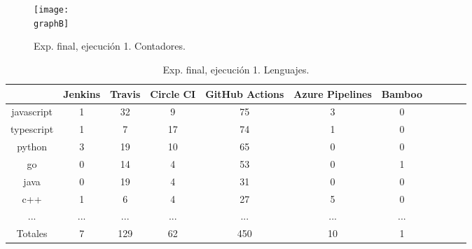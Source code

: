 \begin{figure}
  \centering
  \texttt{[image: \\graphB]}
  \caption{Exp. final, ejecución 1. Contadores.}
\end{figure}

\begin{table}
  \centering
  \caption{Exp. final, ejecución 1. Lenguajes.}
  \label{tab:tabla_f1_2a}

\begin{footnotesize}
\renewcommand{\arraystretch}{1.5} %
\begin{tabular}{ccccccccccc}
  \hline
  {} &  Jenkins &  Travis &  Circle CI &  GitHub Actions &  Azure Pipelines &  Bamboo \\
  \hline
  javascript       &        1 &      32 &          9 &              75 &                3 &       0 \\
  typescript       &        1 &       7 &         17 &              74 &                1 &       0 \\
  python           &        3 &      19 &         10 &              65 &                0 &       0 \\
  go               &        0 &      14 &          4 &              53 &                0 &       1 \\
  java             &        0 &      19 &          4 &              31 &                0 &       0 \\
  c++              &        1 &       6 &          4 &              27 &                5 &       0 \\
  ...              &      ... &     ... &        ... &             ... &              ... &     ... \\
  \hline
  Totales          &        7 &     129 &         62 &             450 &               10 &       1 \\
 \end{tabular}
\end{footnotesize}

\end{table}


